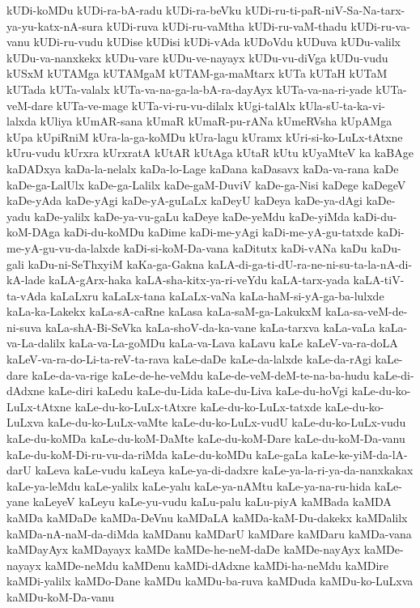 {kUDi-koMDu
kUDi-ra-bA-radu
kUDi-ra-beVku
kUDi-ru-ti-paR-niV-Sa-Na-tarx-ya-yu-katx-nA-sura
kUDi-ruva
kUDi-ru-vaMtha
kUDi-ru-vaM-thadu
kUDi-ru-va-vanu
kUDi-ru-vudu
kUDise
kUDisi
kUDi-vAda
kUDoVdu
kUDuva
kUDu-valilx
kUDu-va-nanxkekx
kUDu-vare
kUDu-ve-nayayx
kUDu-vu-diVga
kUDu-vudu
kUSxM
kUTAMga
kUTAMgaM
kUTAM-ga-maMtarx
kUTa
kUTaH
kUTaM
kUTada
kUTa-valalx
kUTa-va-na-ga-la-bA-ra-dayAyx
kUTa-va-na-ri-yade
kUTa-veM-dare
kUTa-ve-mage
kUTa-vi-ru-vu-dilalx
kUgi-talAlx
kUla-sU-ta-ka-vi-lalxda
kUliya
kUmAR-sana
kUmaR
kUmaR-pu-rANa
kUmeRVsha
kUpAMga
kUpa
kUpiRniM
kUra-la-ga-koMDu
kUra-lagu
kUramx
kUri-si-ko-LuLx-tAtxne
kUru-vudu
kUrxra
kUrxratA
kUtAR
kUtAga
kUtaR
kUtu
kUyaMteV
ka
kaBAge
kaDADxya
kaDa-la-nelalx
kaDa-lo-Lage
kaDana
kaDasavx
kaDa-va-rana
kaDe
kaDe-ga-LalUlx
kaDe-ga-Lalilx
kaDe-gaM-DuviV
kaDe-ga-Nisi
kaDege
kaDegeV
kaDe-yAda
kaDe-yAgi
kaDe-yA-guLaLx
kaDeyU
kaDeya
kaDe-ya-dAgi
kaDe-yadu
kaDe-yalilx
kaDe-ya-vu-gaLu
kaDeye
kaDe-yeMdu
kaDe-yiMda
kaDi-du-koM-DAga
kaDi-du-koMDu
kaDime
kaDi-me-yAgi
kaDi-me-yA-gu-tatxde
kaDi-me-yA-gu-vu-da-lalxde
kaDi-si-koM-Da-vana
kaDitutx
kaDi-vANa
kaDu
kaDu-gali
kaDu-ni-SeThxyiM
kaKa-ga-Gakna
kaLA-di-ga-ti-dU-ra-ne-ni-su-ta-la-nA-di-kA-lade
kaLA-gArx-haka
kaLA-sha-kitx-ya-ri-veYdu
kaLA-tarx-yada
kaLA-tiV-ta-vAda
kaLaLxru
kaLaLx-tana
kaLaLx-vaNa
kaLa-haM-si-yA-ga-ba-lulxde
kaLa-ka-Lakekx
kaLa-sA-caRne
kaLasa
kaLa-saM-ga-LakukxM
kaLa-sa-veM-de-ni-suva
kaLa-shA-Bi-SeVka
kaLa-shoV-da-ka-vane
kaLa-tarxva
kaLa-vaLa
kaLa-va-La-dalilx
kaLa-va-La-goMDu
kaLa-va-Lava
kaLavu
kaLe
kaLeV-va-ra-doLA
kaLeV-va-ra-do-Li-ta-reV-ta-rava
kaLe-daDe
kaLe-da-lalxde
kaLe-da-rAgi
kaLe-dare
kaLe-da-va-rige
kaLe-de-he-veMdu
kaLe-de-veM-deM-te-na-ba-hudu
kaLe-di-dAdxne
kaLe-diri
kaLedu
kaLe-du-Lida
kaLe-du-Liva
kaLe-du-hoVgi
kaLe-du-ko-LuLx-tAtxne
kaLe-du-ko-LuLx-tAtxre
kaLe-du-ko-LuLx-tatxde
kaLe-du-ko-LuLxva
kaLe-du-ko-LuLx-vaMte
kaLe-du-ko-LuLx-vudU
kaLe-du-ko-LuLx-vudu
kaLe-du-koMDa
kaLe-du-koM-DaMte
kaLe-du-koM-Dare
kaLe-du-koM-Da-vanu
kaLe-du-koM-Di-ru-vu-da-riMda
kaLe-du-koMDu
kaLe-gaLa
kaLe-ke-yiM-da-lA-darU
kaLeva
kaLe-vudu
kaLeya
kaLe-ya-di-dadxre
kaLe-ya-la-ri-ya-da-nanxkakax
kaLe-ya-leMdu
kaLe-yalilx
kaLe-yalu
kaLe-ya-nAMtu
kaLe-ya-na-ru-hida
kaLe-yane
kaLeyeV
kaLeyu
kaLe-yu-vudu
kaLu-palu
kaLu-piyA
kaMBada
kaMDA
kaMDa
kaMDaDe
kaMDa-DeVnu
kaMDaLA
kaMDa-kaM-Du-dakekx
kaMDalilx
kaMDa-nA-naM-da-diMda
kaMDanu
kaMDarU
kaMDare
kaMDaru
kaMDa-vana
kaMDayAyx
kaMDayayx
kaMDe
kaMDe-he-neM-daDe
kaMDe-nayAyx
kaMDe-nayayx
kaMDe-neMdu
kaMDenu
kaMDi-dAdxne
kaMDi-ha-neMdu
kaMDire
kaMDi-yalilx
kaMDo-Dane
kaMDu
kaMDu-ba-ruva
kaMDuda
kaMDu-ko-LuLxva
kaMDu-koM-Da-vanu
}
